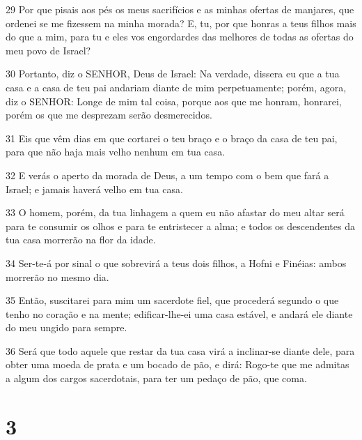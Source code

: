 \par 29 Por que pisais aos pés os meus sacrifícios e as minhas ofertas de manjares, que ordenei se me fizessem na minha morada? E, tu, por que honras a teus filhos mais do que a mim, para tu e eles vos engordardes das melhores de todas as ofertas do meu povo de Israel?
\par 30 Portanto, diz o SENHOR, Deus de Israel: Na verdade, dissera eu que a tua casa e a casa de teu pai andariam diante de mim perpetuamente; porém, agora, diz o SENHOR: Longe de mim tal coisa, porque aos que me honram, honrarei, porém os que me desprezam serão desmerecidos.
\par 31 Eis que vêm dias em que cortarei o teu braço e o braço da casa de teu pai, para que não haja mais velho nenhum em tua casa.
\par 32 E verás o aperto da morada de Deus, a um tempo com o bem que fará a Israel; e jamais haverá velho em tua casa.
\par 33 O homem, porém, da tua linhagem a quem eu não afastar do meu altar será para te consumir os olhos e para te entristecer a alma; e todos os descendentes da tua casa morrerão na flor da idade.
\par 34 Ser-te-á por sinal o que sobrevirá a teus dois filhos, a Hofni e Finéias: ambos morrerão no mesmo dia.
\par 35 Então, suscitarei para mim um sacerdote fiel, que procederá segundo o que tenho no coração e na mente; edificar-lhe-ei uma casa estável, e andará ele diante do meu ungido para sempre.
\par 36 Será que todo aquele que restar da tua casa virá a inclinar-se diante dele, para obter uma moeda de prata e um bocado de pão, e dirá: Rogo-te que me admitas a algum dos cargos sacerdotais, para ter um pedaço de pão, que coma.

\chapter{3}

